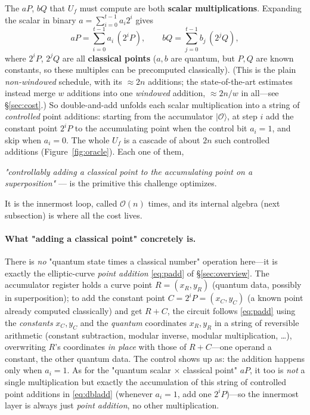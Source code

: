 \documentclass[11pt]{article}
\newcommand{\secref}[1]{\hyperref[#1]{\S\ref*{#1}}}
\begin{document}
The $aP$, $bQ$ that $U_f$ must compute are both \textbf{scalar multiplications}. Expanding the scalar in binary $a=\sum_{i=0}^{t-1}a_i 2^i$ gives
\begin{equation}
aP=\sum_{i=0}^{t-1} a_i\,(2^iP),\qquad bQ=\sum_{j=0}^{t-1} b_j\,(2^jQ),
\label{eq:dbladd}
\end{equation}
where $2^iP$, $2^jQ$ are all \textbf{classical points} ($a,b$ are quantum, but $P,Q$ are known constants, so these multiples can be precomputed classically). (This is the plain \emph{non-windowed} schedule, with its $\approx2n$ additions; the state-of-the-art estimates instead merge $w$ additions into one \emph{windowed} addition, $\approx2n/w$ in all---see \secref{sec:cost}.)
So double-and-add unfolds each scalar multiplication into a string of \emph{controlled} point additions: starting from the accumulator $\lvert\mathcal{O}\rangle$, at step $i$
add the constant point $2^iP$ to the accumulating point when the control bit $a_i=1$, and skip when $a_i=0$. The whole $U_f$ is a cascade of about $2n$ such controlled additions
(Figure~\ref{fig:oracle}). Each one of them,
\begin{center}
\emph{"controllably adding a classical point to the accumulating point on a superposition"} --- is the primitive this challenge optimizes.
\end{center}
It is the innermost loop, called $\mathcal{O}(n)$ times, and its internal algebra (next subsection) is where all the cost lives.

\paragraph{What "adding a classical point" concretely is.}
There is \emph{no} "quantum state times a classical number" operation here---it is exactly the elliptic-curve \emph{point addition} \eqref{eq:padd} of \secref{sec:overview}.
The accumulator register holds a curve point $R=(x_R,y_R)$ (quantum data, possibly in superposition); to add the constant point $C=2^iP=(x_C,y_C)$ (a known point already computed classically)
and get $R+C$, the circuit follows \eqref{eq:padd} using the \emph{constants} $x_C,y_C$ and the \emph{quantum} coordinates $x_R,y_R$ in a string of reversible
arithmetic (constant subtraction, modular inverse, modular multiplication, \dots), overwriting $R$'s coordinates \emph{in place} with those of $R+C$---one operand a constant, the other quantum
data. The control shows up as: the addition happens only when $a_i=1$. As for the "quantum scalar $\times$ classical point" $aP$, it too is \emph{not} a single multiplication but exactly
the accumulation of this string of controlled point additions in \eqref{eq:dbladd} (whenever $a_i=1$, add one $2^iP$)---so the innermost layer is always just \emph{point addition}, no other multiplication.
\end{document}
